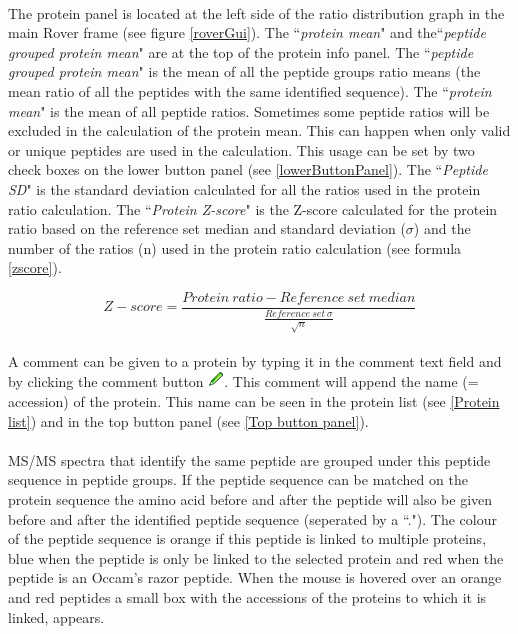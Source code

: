 \documentclass[11pt,a4paper,oneside,notitlepage]{book}
\begin{document}
\paragraph{}The protein panel is located at the left side of the ratio distribution graph in the main Rover frame (see figure \ref{roverGui}). The ``\textit{protein mean}" and the``\textit{peptide grouped protein mean}" are at the top of the protein info panel. The ``\textit{peptide grouped protein mean}" is the mean of all the peptide groups ratio means (the mean ratio of all the peptides with the same identified sequence). The ``\textit{protein mean}" is the mean of all peptide ratios. Sometimes some peptide ratios will be excluded in the calculation of the protein mean. This can happen when only valid or unique peptides are used in the calculation. This usage can be set by two check boxes on the lower button panel (see \ref{lowerButtonPanel}). The ``\textit{Peptide SD}" is the standard deviation calculated for all the ratios used in the protein ratio calculation. The ``\textit{Protein Z-score}" is the Z-score calculated for the protein ratio based on the reference set median and standard deviation ($\sigma$) and the number of the ratios (n) used in the protein ratio calculation (see formula \ref{zscore}).

\begin{equation}
Z-score = \dfrac{Protein \ ratio - Reference \ set \ median}{\frac{Reference \ set \ \sigma}{\sqrt{n}}}
\label{zscore} 
\end{equation}

\paragraph{}A comment can be given to a protein by typing it in the comment text field and by clicking the comment button \includegraphics[scale=0.6, H]{pencil.png}. This comment will append the name (= accession) of the protein. This name can be seen in the protein list (see \ref{Protein list}) and in the top button panel (see \ref{Top button panel}).

\paragraph{}MS/MS spectra that identify the same peptide are grouped under this peptide sequence in peptide groups. If the peptide sequence can be matched on the protein sequence the amino acid before and after the peptide will also be given before and after the identified peptide sequence (seperated by a ``."). The colour of the peptide sequence is orange if this peptide is linked to multiple proteins, blue when the peptide is only be linked to the selected protein and red when the peptide is an Occam's razor peptide. When the mouse is hovered over an orange and red peptides a small box with the accessions of the proteins to which it is linked, appears.
\end{document}
